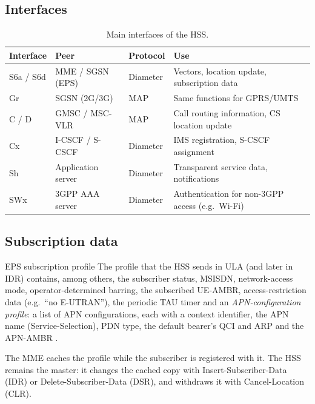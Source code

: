 \documentclass[11pt,a4paper]{article}
\begin{document}
\subsection{Interfaces}
\begin{table}[htbp]
\centering\small
\caption{Main interfaces of the HSS.}\label{tab:ifaces}
\begin{tabularx}{\linewidth}{@{}l l l Y@{}}
\toprule
{}Interface & Peer & Protocol & Use \\
\midrule
S6a / S6d & MME / SGSN (EPS)   & Diameter & Vectors, location update, subscription data \cite{ts29272} \\
Gr        & SGSN (2G/3G)       & MAP      & Same functions for GPRS/UMTS \cite{ts29002} \\
C / D     & GMSC / MSC-VLR     & MAP      & Call routing information, CS location update \cite{ts29002} \\
Cx        & I-CSCF / S-CSCF    & Diameter & IMS registration, S-CSCF assignment \\
Sh        & Application server & Diameter & Transparent service data, notifications \\
SWx       & 3GPP AAA server    & Diameter & Authentication for non-3GPP access (e.g.\ Wi-Fi) \\
\bottomrule
\end{tabularx}
\end{table}

\subsection{Subscription data}
\begin{definitionbox}{EPS subscription profile}
The profile that the HSS sends in ULA (and later in IDR) contains, among others, the subscriber status,
MSISDN, network-access mode, operator-determined barring, the subscribed UE-AMBR, access-restriction
data (e.g.\ ``no E-UTRAN''), the periodic TAU timer and an \emph{APN-configuration profile}: a list of
APN configurations, each with a context identifier, the APN name (Service-Selection), PDN type, the
default bearer's QCI and ARP and the APN-AMBR \cite{ts29272}.
\end{definitionbox}
The MME caches the profile while the subscriber is registered with it. The HSS remains the master: it
changes the cached copy with Insert-Subscriber-Data (IDR) or Delete-Subscriber-Data (DSR), and
withdraws it with Cancel-Location (CLR).
\end{document}
